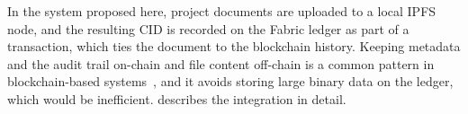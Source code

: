 In the system proposed here, project documents are uploaded to a local IPFS node, and the resulting CID is recorded on the Fabric ledger as part of a transaction, which ties the document to the blockchain history. Keeping metadata and the audit trail on-chain and file content off-chain is a common pattern in blockchain-based systems~\cite{adel2023}, and it avoids storing large binary data on the ledger, which would be inefficient.  describes the integration in detail.
